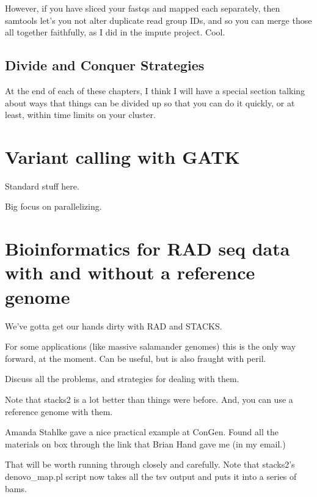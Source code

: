 \documentclass[]{krantz}
\begin{document}
However, if you have sliced your fastqs and mapped each separately, then
samtools let's you not alter duplicate read group IDs, and so you can merge
those all together faithfully, as I did in the impute project. Cool.

\hypertarget{divide-and-conquer-strategies}{%
\section{Divide and Conquer Strategies}\label{divide-and-conquer-strategies}}

At the end of each of these chapters, I think I will
have a special section talking about ways that things can be divided
up so that you can do it quickly, or at least, within time limits
on your cluster.

\hypertarget{variant-calling-with-gatk}{%
\chapter{Variant calling with GATK}\label{variant-calling-with-gatk}}

Standard stuff here.

Big focus on parallelizing.

\hypertarget{bioinformatics-for-rad-seq-data-with-and-without-a-reference-genome}{%
\chapter{Bioinformatics for RAD seq data with and without a reference genome}\label{bioinformatics-for-rad-seq-data-with-and-without-a-reference-genome}}

We've gotta get our hands dirty with RAD and STACKS.

For some applications (like massive salamander genomes) this is the only
way forward, at the moment. Can be useful, but is also
fraught with peril.

Discuss all the problems, and strategies for dealing with them.

Note that stacks2 is a lot better than things were before. And, you can use
a reference genome with them.

Amanda Stahlke gave a nice practical example at ConGen. Found all the materials
on box through the link that Brian Hand gave me (in my email.)

That will be worth running through closely and carefully. Note that stacks2's denovo\_map.pl script
now takes all the tsv output and puts it into a series of bams.
\end{document}
